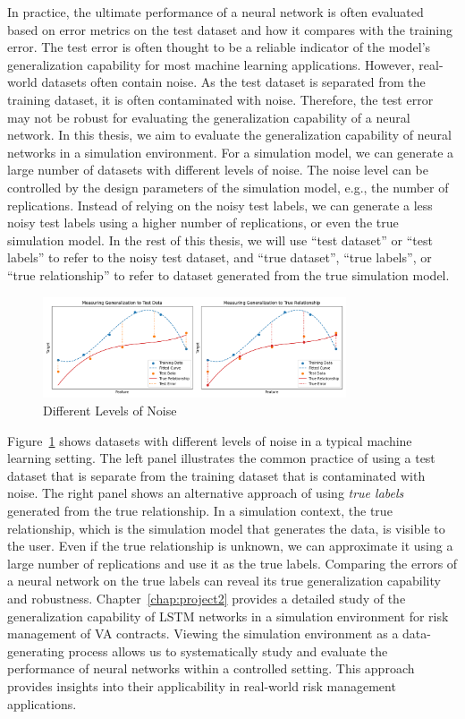 In practice, the ultimate performance of a neural network is often evaluated based on error metrics on the test dataset and how it compares with the training error. 
The test error is often thought to be a reliable indicator of the model's generalization capability for most machine learning applications.
However, real-world datasets often contain noise.
As the test dataset is separated from the training dataset, it is often contaminated with noise.
Therefore, the test error may not be robust for evaluating the generalization capability of a neural network.
In this thesis, we aim to evaluate the generalization capability of neural networks in a simulation environment.
For a simulation model, we can generate a large number of datasets with different levels of noise.
The noise level can be controlled by the design parameters of the simulation model, e.g., the number of replications.
Instead of relying on the noisy test labels, we can generate a less noisy test labels using a higher number of replications, or even the true simulation model.
In the rest of this thesis, we will use ``test dataset'' or ``test labels'' to refer to the noisy test dataset, and ``true dataset'', ``true labels'', or ``true relationship'' to refer to dataset generated from the true simulation model.

\begin{figure}[ht!] 
    \centering
    \includegraphics[width=0.8\textwidth]{./project2/figures/datasets.png}
    \caption{Different Levels of Noise}
    \label{fig:datasets}
\end{figure}

Figure~\ref{fig:datasets} shows datasets with different levels of noise in a typical machine learning setting.
The left panel illustrates the common practice of using a test dataset that is separate from the training dataset that is contaminated with noise.
The right panel shows an alternative approach of using \textit{true labels} generated from the true relationship.
In a simulation context, the true relationship, which is the simulation model that generates the data, is visible to the user.
Even if the true relationship is unknown, we can approximate it using a large number of replications and use it as the true labels.
Comparing the errors of a neural network on the true labels can reveal its true generalization capability and robustness.
Chapter~\ref{chap:project2} provides a detailed study of the generalization capability of LSTM networks in a simulation environment for risk management of VA contracts.
Viewing the simulation environment as a data-generating process allows us to systematically study and evaluate the performance of neural networks within a controlled setting.
This approach provides insights into their applicability in real-world risk management applications.

